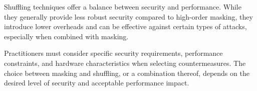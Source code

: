 Shuffling techniques offer a balance between security and performance. While they generally provide less robust security compared to high-order masking, they introduce lower overheads and can be effective against certain types of attacks, especially when combined with masking.

Practitioners must consider specific security requirements, performance constraints, and hardware characteristics when selecting countermeasures. The choice between masking and shuffling, or a combination thereof, depends on the desired level of security and acceptable performance impact.